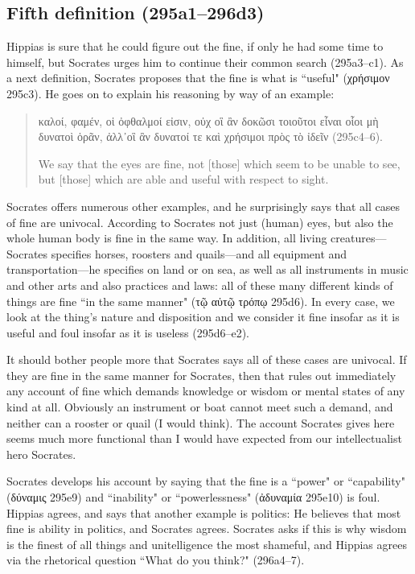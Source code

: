 \documentclass[11pt]{article}
\begin{document}
\subsection{Fifth definition (295a1--296d3)}

Hippias is sure that he could figure out the fine, if only he had some time to himself, but Socrates urges him to continue their common search (295a3--c1).  As a next definition, Socrates proposes that the fine is what is ``useful" (χρήσιμον 295c3).  He goes on to explain his reasoning by way of an example:

\begin{quote}
    καλοί, φαμέν, οἱ ὀφθαλμοί εἰσιν, οὐχ οἳ ἂν δοκῶσι τοιοῦτοι εἶναι οἷοι μὴ δυνατοὶ ὁρᾶν, ἀλλ᾽οἳ ἂν δυνατοί τε καὶ χρήσιμοι πρὸς τὸ ἰδεῖν (295c4--6).

    We say that the eyes are fine, not [those] which seem to be unable to see, but [those] which are able and useful with respect to sight.
\end{quote}

Socrates offers numerous other examples, and he surprisingly says that all cases of fine are univocal.  According to Socrates not just (human) eyes, but also the whole human body is fine in the same way.  In addition, all living creatures---Socrates specifies horses, roosters and quails---and all equipment and transportation---he specifies on land or on sea, as well as all instruments in music and other arts and also practices and laws: all of these many different kinds of things are fine ``in the same manner" (τῷ αὐτῷ τρόπῳ 295d6).  In every case, we look at the thing's nature and disposition and we consider it fine insofar as it is useful and foul insofar as it is useless (295d6--e2).

It should bother people more that Socrates says all of these cases are univocal.  If they are fine in the same manner for Socrates, then that rules out immediately any account of fine which demands knowledge or wisdom or mental states of any kind at all.  Obviously an instrument or boat cannot meet such a demand, and neither can a rooster or quail (I would think).  The account Socrates gives here seems much more functional than I would have expected from our intellectualist hero Socrates.

Socrates develops his account by saying that the fine is a ``power" or ``capability" (δύναμις 295e9) and ``inability" or ``powerlessness" (ἀδυναμία 295e10) is foul.  Hippias agrees, and says that another example is politics: He believes that most fine is ability in politics, and Socrates agrees.  Socrates asks if this is why wisdom is the finest of all things and unitelligence the most shameful, and Hippias agrees via the rhetorical question ``What do you think?" (296a4--7).
\end{document}

